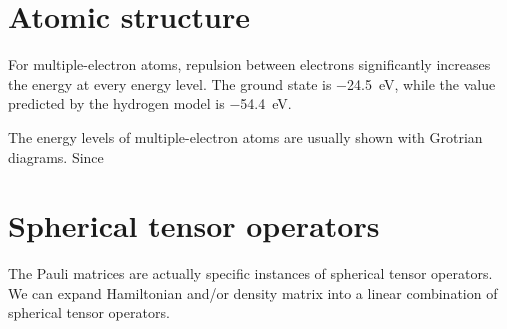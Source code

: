 \documentclass[hyperref, a4paper]{article}
\begin{document}
\section{Atomic structure}

For multiple-electron atoms, 
repulsion between electrons significantly increases 
the energy at every energy level.
The ground state is \SI{-24.5}{eV},
while the value predicted by the 
hydrogen model is \SI{-54.4}{eV}.

The energy levels of multiple-electron atoms 
are usually shown with Grotrian diagrams.
Since 

\section{Spherical tensor operators}

The Pauli matrices are actually specific instances of 
spherical tensor operators.
We can expand Hamiltonian and/or density matrix 
into a linear combination of spherical tensor operators.
\end{document}
